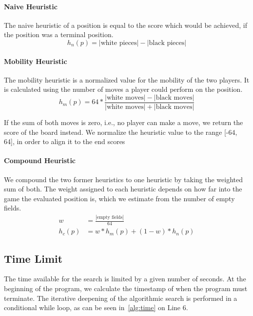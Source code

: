 \paragraph{Naive Heuristic}
The naive heuristic of a position is equal to the score which would be achieved, if the position was a terminal position.
\[h_{n}(p) = |\text{white pieces}| - |\text{black pieces}|\]

\paragraph{Mobility Heuristic}
The mobility heuristic is a normalized value for the mobility of the two players.
It is calculated using the number of moves a player could perform on the position.
\[h_{m}(p) = 64 * \frac{|\text{white moves}| - |\text{black moves}|}{|\text{white moves}| + |\text{black moves}|} \]

If the sum of both moves is zero, i.e., no player can make a move, we return the score of the board instead.
We normalize the heuristic value to the range [-64, 64], in order to align it to the end scores

\paragraph{Compound Heuristic}
We compound the two former heuristics to one heuristic by taking the weighted sum of both.
The weight assigned to each heuristic depends on how far into the game the evaluated position is, which we estimate from the number of empty fields.
\begin{align*}
    w &= \frac{|\text{empty fields}|}{64} \\
    h_{c}(p) &= w * h_{m}(p) + (1 - w) * h_{n}(p)
\end{align*}


\subsection{Time Limit}
The time available for the search is limited by a given number of seconds.
At the beginning of the program, we calculate the timestamp of when the program must terminate.
The iterative deepening of the algorithmic search is performed in a conditional while loop, as can be seen in~\cref{alg:time} on Line 6.

